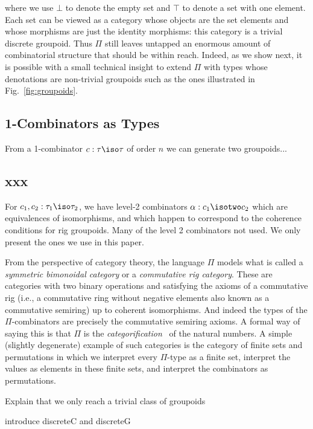 \noindent where we use $\bot$ to denote the empty set and $\top$ to
denote a set with one element. Each set can be viewed as a category
whose objects are the set elements and whose morphisms are just the
identity morphisms: this category is a trivial discrete groupoid. Thus
$\Pi$ still leaves untapped an enormous amount of combinatorial
structure that should be within reach. Indeed, as we show next, it is
possible with a small technical insight to extend $\Pi$ with types
whose denotations are non-trivial groupoids such as the ones
illustrated in Fig.~\ref{fig:groupoids}. 

\subsection{1-Combinators as Types} 

From a 1-combinator $c : \tau \iso \tau$ of order $n$ we can generate
two groupoids...


\subsection{xxx}
 
For $c_1, c_2 : \tau_1\iso\tau_2$, we have level-2 combinators $\alpha
: c_1 \isotwo c_2$ which are equivalences of isomorphisms, and which
happen to correspond to the coherence conditions for rig
groupoids. Many of the level 2 combinators not used. We only present
the ones we use in this paper.

 From the perspective of category theory, the language $\Pi$ models what is
called a \emph{symmetric bimonoidal category} or a \emph{commutative rig
category}. These are categories with two binary operations and satisfying the
axioms of a commutative rig (i.e., a commutative ring without negative
elements also known as a commutative semiring) up to coherent
isomorphisms. And indeed the types of the $\Pi$-combinators are precisely the
commutative semiring axioms. A formal way of saying this is that $\Pi$ is the
\emph{categorification}~\cite{math/9802029} of the natural numbers. A simple
(slightly degenerate) example of such categories is the category of finite
sets and permutations in which we interpret every $\Pi$-type as a finite set,
interpret the values as elements in these finite sets, and interpret the
combinators as permutations. 

Explain that we only reach a trivial class of groupoids

introduce discreteC and discreteG

